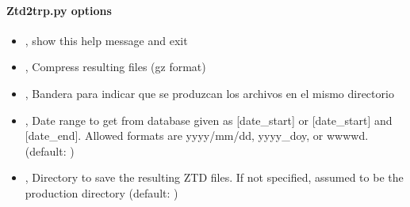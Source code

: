 \documentclass[letterpaper,10pt,english]{sphinxmanual}
\begin{document}
\paragraph{Ztd2trp.py options}
\label{\detokenize{com:Ztd2trp.py-options}}\begin{itemize}
\item {} 
\sphinxAtStartPar
{\hyperref[\detokenize{com:Ztd2trp.py--h}]{}}, {\hyperref[\detokenize{com:Ztd2trp.py---help}]{}} \sphinxhyphen{} show this help message and exit

\item {} 
\sphinxAtStartPar
{\hyperref[\detokenize{com:Ztd2trp.py--z}]{}}, {\hyperref[\detokenize{com:Ztd2trp.py---compress}]{}} \sphinxhyphen{} Compress resulting files (gz format)

\item {} 
\sphinxAtStartPar
{\hyperref[\detokenize{com:Ztd2trp.py--c}]{}}, {\hyperref[\detokenize{com:Ztd2trp.py---produce_here}]{}} \sphinxhyphen{} Bandera para indicar que se produzcan los archivos en el mismo directorio

\item {} 
\sphinxAtStartPar
{\hyperref[\detokenize{com:Ztd2trp.py--date}]{}} , {\hyperref[\detokenize{com:Ztd2trp.py---date_range}]{}}  \sphinxhyphen{} Date range to get from database given as {[}date\_start{]} or {[}date\_start{]} and {[}date\_end{]}. Allowed formats are yyyy/mm/dd, yyyy\_doy, or wwww\sphinxhyphen{}d. (default: )

\item {} 
\sphinxAtStartPar
{\hyperref[\detokenize{com:Ztd2trp.py--dir}]{}} , {\hyperref[\detokenize{com:Ztd2trp.py---directory}]{}}  \sphinxhyphen{} Directory to save the resulting ZTD files. If not specified, assumed to be the production directory (default: )

\end{itemize}
\end{document}
